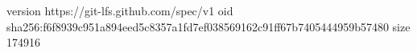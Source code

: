 version https://git-lfs.github.com/spec/v1
oid sha256:f6f8939c951a894eed5c8357a1fd7ef038569162c91ff67b7405444959b57480
size 174916
